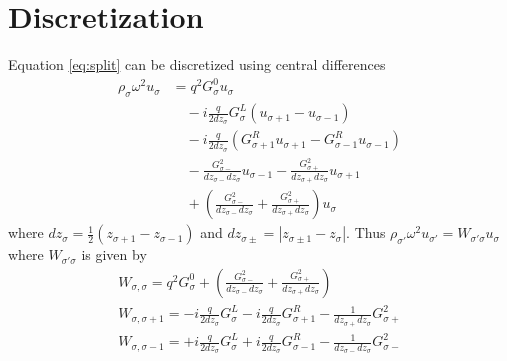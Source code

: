\documentclass{article}
\begin{document}
\section{Discretization}
Equation \eqref{eq:split}  can be discretized using central differences
\begin{align}
  \rho_\sigma\omega^2u_\sigma&=q^2G^0_\sigma u_\sigma\\
  &\quad-i\frac{q}{2dz_\sigma}G^L_\sigma \left( u_{\sigma+1}-u_{\sigma-1} \right)\\
  &\quad-i\frac{q}{2dz_\sigma} \left( G^R_{\sigma+1} u_{\sigma+1}-G^R_{\sigma-1} u_{\sigma-1} \right)\\
  &\quad-\frac{G^2_{\sigma-}}{dz_{\sigma-}dz_{\sigma}}u_{\sigma-1}-\frac{G^2_{\sigma+}}{dz_{\sigma+}dz_{\sigma}}u_{\sigma+1}\\
  &\quad+\left(\frac{G^2_{\sigma-}}{dz_{\sigma-}dz_\sigma}+\frac{G^2_{\sigma+}}{dz_{\sigma+}dz_\sigma}\right)u_\sigma
\end{align}
where $dz_{\sigma}=\frac{1}{2}(z_{\sigma+1}-z_{\sigma-1})$ and $dz_{\sigma\pm}=|z_{\sigma\pm 1}-z_\sigma|$.  Thus $\rho_{\sigma'}\omega^2 u_{\sigma'}=W_{\sigma' \sigma} u_\sigma$ where $W_{\sigma' \sigma} $ is given by
\begin{align}
  W_{\sigma,\sigma}=q^2 G^0_\sigma +\left(\frac{G^2_{\sigma-}}{dz_{\sigma-}dz_\sigma}+\frac{G^2_{\sigma+}}{dz_{\sigma+}dz_\sigma}\right)\\
  W_{\sigma,\sigma+1}=
  -i\frac{q}{2dz_\sigma}G^L_\sigma
  -i\frac{q}{2dz_\sigma} G^R_{\sigma+1}
  -\frac{1}{dz_{\sigma+}dz_{\sigma}}G^2_{\sigma+}\\
  W_{\sigma,\sigma-1}=
  +i\frac{q}{2dz_\sigma}G^L_\sigma
  +i\frac{q}{2dz_\sigma} G^R_{\sigma-1}
  -\frac{1}{dz_{\sigma-}dz_{\sigma}}G^2_{\sigma-}
\end{align}
\end{document}
